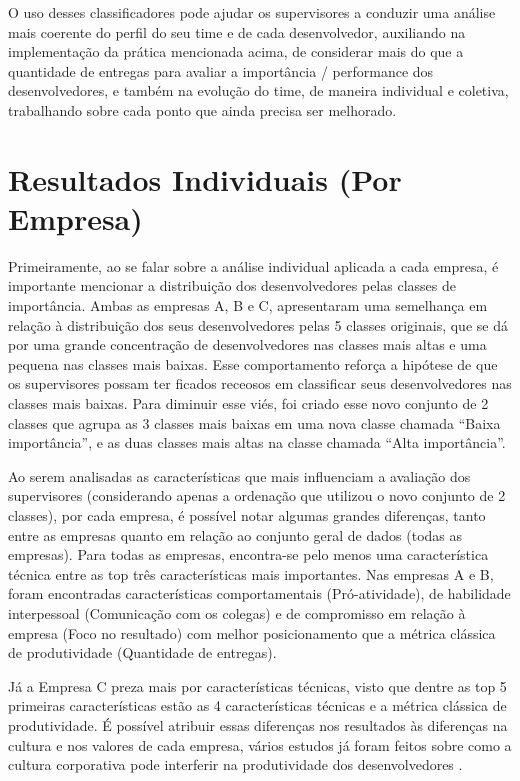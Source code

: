 O uso desses classificadores pode ajudar os supervisores a conduzir uma análise mais coerente do perfil do seu time e de cada desenvolvedor, auxiliando na implementação da prática mencionada acima, de considerar mais do que a quantidade de entregas para avaliar a importância / performance dos desenvolvedores, e também na evolução do time, de maneira individual e coletiva, trabalhando sobre cada ponto que ainda precisa ser melhorado.

\section{Resultados Individuais (Por Empresa)}


Primeiramente, ao se falar sobre a análise individual aplicada a cada empresa, é importante mencionar a distribuição dos desenvolvedores pelas classes de importância. Ambas as empresas A, B e C, apresentaram uma semelhança em relação à distribuição dos seus desenvolvedores pelas 5 classes originais, que se dá por uma grande concentração de desenvolvedores nas classes mais altas e uma pequena nas classes mais baixas. Esse comportamento reforça a hipótese de que os supervisores possam ter ficados receosos em classificar seus desenvolvedores nas classes mais baixas. Para diminuir esse viés, foi criado esse novo conjunto de 2 classes que agrupa as 3 classes mais baixas em uma nova classe chamada ``Baixa importância'', e as duas classes mais altas na classe chamada ``Alta importância''.


Ao serem analisadas as características que mais influenciam a avaliação dos supervisores (considerando apenas a ordenação que utilizou o novo conjunto de 2 classes), por cada empresa, é possível notar algumas grandes diferenças, tanto entre as empresas quanto em relação ao conjunto geral de dados (todas as empresas). Para todas as empresas, encontra-se pelo menos uma característica técnica entre as top três características mais importantes. Nas empresas A e B, foram encontradas características comportamentais (Pró-atividade), de habilidade interpessoal (Comunicação com os colegas) e de compromisso em relação à empresa (Foco no resultado) com melhor posicionamento que a métrica clássica de produtividade (Quantidade de entregas).

Já a Empresa C preza mais por características técnicas, visto que dentre as top 5 primeiras características estão as 4 características técnicas e a métrica clássica de produtividade. É possível atribuir essas diferenças nos resultados às diferenças na cultura e nos valores de cada empresa, vários estudos já foram feitos sobre como a cultura corporativa pode interferir na produtividade dos desenvolvedores \cite{Edmans2011,Jones2000,Scudder1991,AgrellA.andGustafson1994,Guzzo1988,McLean1996,Turcotte2004}.

